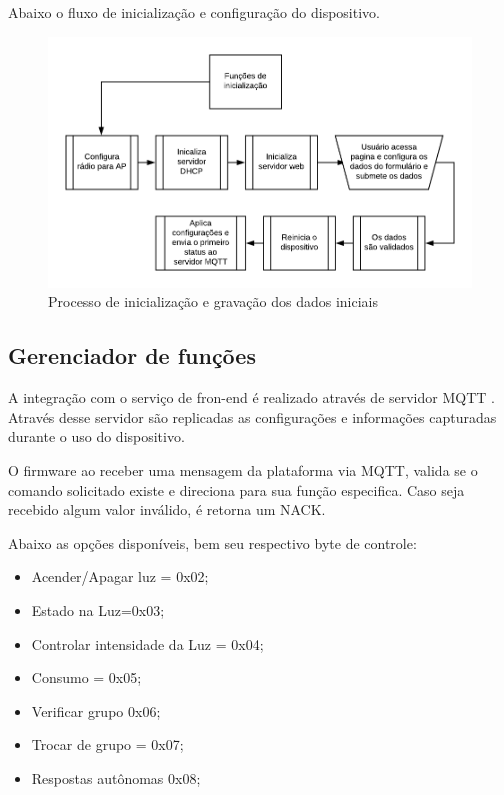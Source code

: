 \documentclass[openright]{normas-utf-tex} %
\begin{document}
Abaixo o fluxo de inicialização e configuração do dispositivo.
\begin{figure}[!htb]
     \centering
     \includegraphics[scale=1]{Ini_flux.png}
     \caption{Processo de inicialização e gravação dos dados iniciais}
     \label{}
\end{figure}

\subsection{Gerenciador de funções}

A integração com o serviço de fron-end é realizado através de servidor MQTT \cite{Novatec}. Através desse servidor são replicadas as configurações e informações capturadas durante o uso do dispositivo. 

O firmware ao receber uma mensagem da plataforma via MQTT, valida se o comando solicitado existe e direciona para sua função especifica. Caso seja recebido algum valor inválido, é retorna um NACK.

Abaixo as opções disponíveis, bem seu respectivo byte de controle:

\begin{itemize}
    \item Acender/Apagar luz = 0x02;
    \item Estado na Luz=0x03;
    \item Controlar intensidade da Luz = 0x04;
    \item Consumo = 0x05;
    \item Verificar grupo 0x06;
    \item Trocar de grupo = 0x07;
    \item Respostas autônomas 0x08;
\end{itemize}
\end{document}
